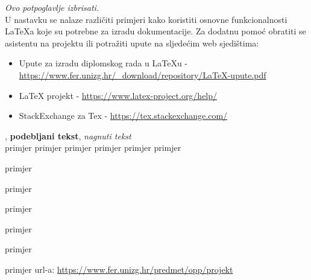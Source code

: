 		\textit{Ovo potpoglavlje izbrisati.}\\

		U nastavku se nalaze različiti primjeri kako koristiti osnovne funkcionalnosti LaTeXa koje su potrebne za izradu dokumentacije. Za dodatnu pomoć obratiti se asistentu na projektu ili potražiti upute na sljedećim web sjedištima:
		\begin{itemize}
			\item Upute za izradu diplomskog rada u LaTeXu - \url{https://www.fer.unizg.hr/_download/repository/LaTeX-upute.pdf}
			\item LaTeX projekt - \url{https://www.latex-project.org/help/}
			\item StackExchange za Tex - \url{https://tex.stackexchange.com/}\\
		
		\end{itemize} 	


		
		
		, 
		\textbf{podebljani tekst}, 
		\textit{nagnuti tekst}\\
		\normalsize primjer
		\large primjer
		\Large primjer
		\LARGE {primjer}
		\huge {primjer}
		\Huge primjer
		\normalsize
				
		\begin{packed_item}
			
			\item  primjer
			\item  primjer
			\item  primjer
			\item[] \begin{packed_enum}
				
				\item primjer
				\item primjer
			\end{packed_enum}
			
		\end{packed_item}
		
		\noindent primjer url-a: \url{https://www.fer.unizg.hr/predmet/opp/projekt}
		
